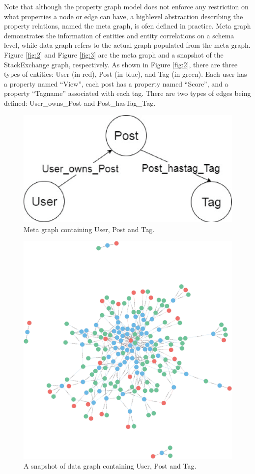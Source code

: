 Note that although the property graph model does not enforce any restriction on what properties a node or edge can have, a highlevel abstraction describing the property relations, named the meta graph, is ofen defined in practice. Meta graph demonstrates the information of entities and entity correlations on a schema level, while data graph refers to the actual graph populated from the meta graph. Figure \ref{fig:2} and Figure \ref{fig:3} are the meta graph and a snapshot of the StackExchange graph, respectively. As shown in Figure \ref{fig:2}, there are three types of entities: User (in red), Post (in blue), and Tag (in green). Each user has a property named ``View'', each post has a property named ``Score'', and a property ``Tagname'' associated with each tag. There are two types of edges being  defined: User\_owns\_Post and Post\_hasTag\_Tag.


\begin{figure}[H]
\centering
\includegraphics[scale=0.5]{pic/12.eps}
\caption{Meta graph containing User, Post and Tag.}
\end{figure}

\begin{figure}[H]
\centering
\includegraphics[scale=0.1]{pic/3.eps}
\caption{A snapshot of data graph containing User, Post and Tag.}
\end{figure}

